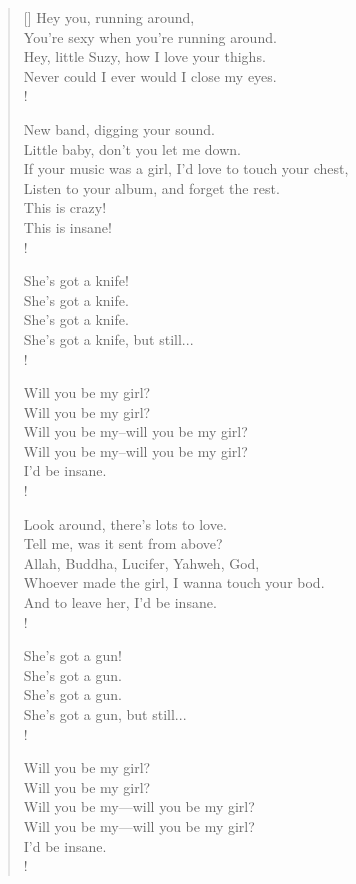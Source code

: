 \documentclass[twoside]{article}
\begin{document}
\newpage
\settowidth{\versewidth}{If your music was a girl, I'd love to touch your chest,}
\begin{verse}[\versewidth]
Hey you, running around,\\
You're sexy when you're running around.\\
Hey, little Suzy, how I love your thighs.\\
Never could I ever would I close my eyes.\\!

New band, digging your sound.\\
Little baby, don't you let me down.\\
If your music was a girl, I'd love to touch your chest,\\
Listen to your album, and forget the rest.\\
This is crazy!\\
This is insane!\\!

She's got a knife!\\
She's got a knife.\\
She's got a knife.\\
She's got a knife, but still...\\!

Will you be my girl?\\
Will you be my girl?\\
Will you be my--will you be my girl?\\
Will you be my--will you be my girl?\\
I'd be insane.\\!

Look around, there's lots to love.\\
Tell me, was it sent from above?\\
Allah, Buddha, Lucifer, Yahweh, God,\\
Whoever made the girl, I wanna touch your bod.\\
And to leave her, I'd be insane.\\!

She's got a gun!\\
She's got a gun.\\
She's got a gun.\\
She's got a gun, but still...\\!

Will you be my girl?\\
Will you be my girl?\\
Will you be my---will you be my girl?\\
Will you be my---will you be my girl?\\
I'd be insane.\\!


\end{verse}
\end{document}
